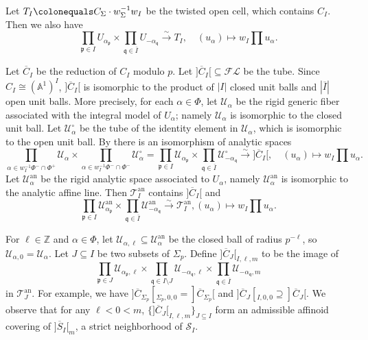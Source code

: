 \documentclass[11pt]{amsart}
\theoremstyle{definition} %
\theoremstyle{plain} %
\theoremstyle{remark} %
\renewcommand{\AA}{\mathbb A}
\newcommand{\ZZ}{{\mathbb Z}}
\newcommand{\cF}{{\mathcal F}}
\newcommand{\cL}{{\mathcal L}}
\newcommand{\cS}{{\mathcal S}}
\newcommand{\cT}{{\mathcal T}}
\newcommand{\cU}{{\mathcal U}}
\newcommand{\frakp}{\mathfrak p}
\newcommand{\frakq}{\mathfrak q}
\newcommand{\defeq}{\colonequals} %
\newcommand{\isom}{\cong} %
\newcommand{\an}{\mathrm{an}}
\begin{document}
Let $T_I \defeq C_\Sigma \cdot w_\Sigma^{-1}w_I$ be the twisted open cell, which contains $C_I$.
Then we also have 
\[
\prod_{\frakp\in I} U_{\alpha_\frakp}\times \prod_{\frakq\in \overline{I}} {U_{-\alpha_\frakq}} \xrightarrow\sim T_{I}, \quad (u_\alpha) \mapsto w_I\prod u_\alpha.
\]
 
Let $\overline{C}_I$ be the reduction of $C_I$ modulo $p$.
Let $]\overline{C}_I[\subseteq \cF\cL$ be the tube.
Since $C_I\isom (\AA^1)^{I}$, $]\overline{C}_I[$ is isomorphic to the product of $|I|$ closed unit balls and $|\overline{I}|$ open unit balls.
More precisely, for each $\alpha\in\Phi$,
let $\cU_\alpha$ be the rigid generic fiber associated with the integral model of $U_\alpha$; namely $\cU_\alpha$ is isomorphic to the closed unit ball.
Let $\cU_\alpha^\circ$ be the tube of the identity element in $\cU_\alpha$, which is isomorphic to the open unit ball. 
By \cite[Cor.~3.3.5]{BP} there is an isomorphism of analytic spaces
\[
\prod_{\alpha\in w_I^{-1} \Phi^- \cap \Phi^+} {\cU_\alpha} \times \prod_{\alpha\in w_I^{-1} \Phi^- \cap \Phi^-} \cU_\alpha^\circ
=\prod_{\frakp\in I} {\cU_{\alpha_\frakp}} \times \prod_{\frakq\in \overline{I}} \cU_{-\alpha_\frakq}^\circ
\xrightarrow\sim ]\overline{C}_{I}[, \quad (u_\alpha) \mapsto w_I\prod u_\alpha.
\]
Let $\cU_\alpha^\an$ be the rigid analytic space associated to $U_\alpha$, namely $\cU_\alpha^\an$ is isomorphic to the analytic affine line. Then $\cT_I^\an$ contains $]\overline{C}_{I}[$ and 
\[
\prod_{\frakp\in I} \cU_{\alpha_\frakp}^\an \times \prod_{\frakq\in \overline{I}} \cU_{-\alpha_\frakq}^\an  \xrightarrow\sim \cT_I^\an, (u_\alpha) \mapsto w_I\prod u_\alpha.
\]

For $\ell\in\ZZ$ and $\alpha\in\Phi$, let $\cU_{\alpha,\ell}\subseteq \cU_{\alpha}^\an$ be the closed ball of radius $p^{-\ell}$, so $\cU_{\alpha,0} = \cU_\alpha$.
Let $J\subseteq I$ be two subsets of $\Sigma_p$.
Define $]\overline{C}_J[_{I,\ell,m}$ to be the image of 
\[\prod_{\frakp\in J} \cU_{\alpha_\frakp,\ell} \times \prod_{\frakq\in I\setminus J} \cU_{-\alpha_\frakq,\ell} \times \prod_{\frakq\in \overline{I}} \cU_{-\alpha_\frakq,m}\]
in $\cT_J^{\an}$.
For example, we have $]\overline{C}_{\Sigma_p}[_{\Sigma_p,0,0} = ]\overline{C}_{\Sigma_p}[$ and $]\overline{C}_J[_{I,0,0} \supseteq ]\overline{C}_{J}[$.
We observe that for any $\ell<0<m$,  $\{]\overline{C}_J[_{I,\ell,m}\}_{J\subseteq I}$ form an admissible affinoid covering of $]\overline{S}_I[_m$, a strict neighborhood of $\cS_I$.
\end{document}
